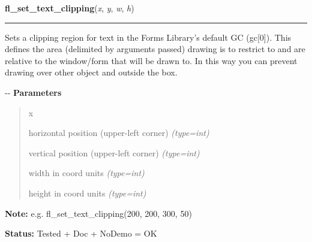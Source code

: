     \label{xformslib:flxbasic:fl_set_text_clipping}

    \vspace{0.5ex}

\hspace{.8\funcindent}\begin{boxedminipage}{\funcwidth}

    \raggedright \textbf{fl\_set\_text\_clipping}(\textit{x}, \textit{y}, \textit{w}, \textit{h})

    \vspace{-1.5ex}

    \rule{\textwidth}{0.5\fboxrule}
\setlength{\parskip}{2ex}

Sets a clipping region for text in the Forms Library's default GC
(gc{[}0{]}). This defines the area (delimited by arguments passed) drawing
is to restrict to and are relative to the window/form that will be
drawn to. In this way you can prevent drawing over other object and
outside the box.

-{}-
\setlength{\parskip}{1ex}
      \textbf{Parameters}
      \vspace{-1ex}

      \begin{quote}
        \begin{Ventry}{x}

          \item[x]


horizontal position (upper-left corner)
            {\it (type=int)}

          \item[y]


vertical position (upper-left corner)
            {\it (type=int)}

          \item[w]


width in coord units
            {\it (type=int)}

          \item[h]


height in coord units
            {\it (type=int)}

        \end{Ventry}

      \end{quote}

\textbf{Note:} 
e.g. fl\_set\_text\_clipping(200, 200, 300, 50)


\textbf{Status:} 
Tested + Doc + NoDemo = OK


    \end{boxedminipage}

